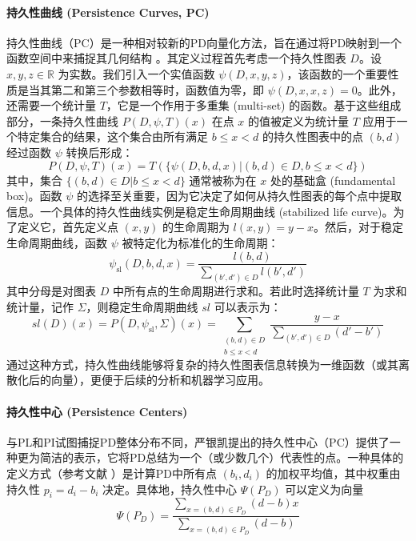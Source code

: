             \paragraph{持久性曲线 (Persistence Curves, PC)}
                \label{sec:feat_pc}
                持久性曲线（PC）\cite{chung2020persistent}是一种相对较新的PD向量化方法，旨在通过将PD映射到一个函数空间中来捕捉其几何结构 。其定义过程首先考虑一个持久性图表 $D$。设 $x, y, z \in \mathbb{R}$ 为实数。我们引入一个实值函数 $\psi(D, x, y, z)$，该函数的一个重要性质是当其第二和第三个参数相等时，函数值为零，即 $\psi(D, x, x, z) = 0$。此外，还需要一个统计量 $T$，它是一个作用于多重集 (multi-set) 的函数。基于这些组成部分，一条持久性曲线 $P(D, \psi, T)(x)$ 在点 $x$ 的值被定义为统计量 $T$ 应用于一个特定集合的结果，这个集合由所有满足 $b \le x < d$ 的持久性图表中的点 $(b,d)$ 经过函数 $\psi$ 转换后形成：
                \begin{equation}
                P(D, \psi, T)(x) = T \left( \{ \psi(D, b, d, x) | (b,d) \in D, b \le x < d \} \right)
                \end{equation}
                其中，集合 $\{ (b,d) \in D | b \le x < d \}$ 通常被称为在 $x$ 处的基础盒 (fundamental box)。函数 $\psi$ 的选择至关重要，因为它决定了如何从持久性图表的每个点中提取信息。一个具体的持久性曲线实例是稳定生命周期曲线 (stabilized life curve)。为了定义它，首先定义点 $(x,y)$ 的生命周期为 $l(x,y) = y-x$。然后，对于稳定生命周期曲线，函数 $\psi$ 被特定化为标准化的生命周期：
                \begin{equation}
                \psi_{\text{sl}}(D, b, d, x) = \frac{l(b,d)}{\sum_{(b',d') \in D} l(b',d')}
                \end{equation}
                其中分母是对图表 $D$ 中所有点的生命周期进行求和。若此时选择统计量 $T$ 为求和统计量，记作 $\Sigma$，则稳定生命周期曲线 $sl$ 可以表示为：
                \begin{equation}
                sl(D)(x) = P(D, \psi_{\text{sl}}, \Sigma)(x) = \sum_{\substack{(b,d) \in D \\ b \le x < d}} \frac{y-x}{\sum_{(b',d') \in D} (d'-b')}
                \end{equation}
                通过这种方式，持久性曲线能够将复杂的持久性图表信息转换为一维函数（或其离散化后的向量），更便于后续的分析和机器学习应用。
                
            \paragraph{持久性中心 (Persistence Centers)}
                \label{sec:feat_pcen}
                与PL和PI试图捕捉PD整体分布不同，严银凯提出的持久性中心（PC）提供了一种更为简洁的表示，它将PD总结为一个（或少数几个）代表性的点。一种具体的定义方式（参考文献 ）是计算PD中所有点 $(b_i, d_i)$ 的加权平均值，其中权重由持久性 $p_i = d_i - b_i$ 决定。具体地，持久性中心 $\Psi(P_D)$ 可以定义为向量
                \begin{equation}
                    \Psi(P_D) = \frac{\sum_{x=(b,d) \in P_D} (d-b) x}{\sum_{x=(b,d) \in P_D} (d-b)}
                    \end{equation}
                    
